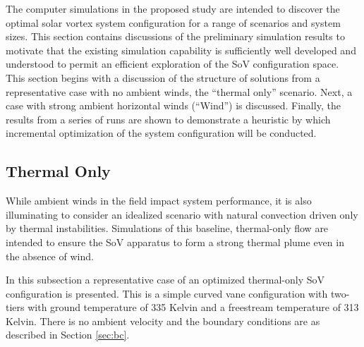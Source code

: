 \label{sec:results}

%
%
%
%

The computer simulations in the proposed study are intended to discover
the optimal solar vortex system configuration for a range of scenarios
and system sizes. This section contains discussions of the preliminary
simulation results to motivate that the existing simulation capability
is sufficiently well developed and understood to permit an efficient
exploration of the SoV configuration space. 
This section begins with a discussion of the structure of solutions from
a representative case with no ambient winds, the ``thermal only''
scenario. Next, a case with strong ambient horizontal winds (``Wind'')
is discussed. Finally, the results from a series of runs are shown to
demonstrate a heuristic by which incremental optimization of the system
configuration will be conducted. 



\subsection{Thermal Only}

While ambient winds in the field impact system performance, it is
also illuminating to consider an idealized scenario with natural convection
driven only by thermal instabilities. Simulations of this baseline,
thermal-only flow are intended to ensure the SoV apparatus to form a
strong thermal plume even in the absence of wind. 

In this subsection a representative case of an optimized thermal-only SoV
configuration is presented. This is a simple curved vane configuration with
two-tiers with ground temperature of 335 Kelvin and a freestream
temperature of 313 Kelvin. There is no ambient velocity and the boundary
conditions are as described in Section \ref{sec:bc}. 

